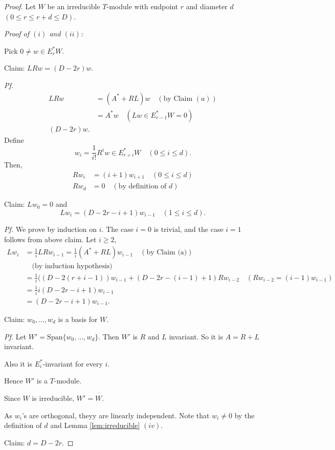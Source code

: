 \documentclass[
]{book}
\theoremstyle{definition}
\theoremstyle{definition}
\theoremstyle{definition}
\theoremstyle{definition}
\theoremstyle{remark}
\begin{document}
\begin{proof}
Let \(W\) be an irreducible \(T\)-module with endpoint \(r\) and diameter \(d\) \((0\leq r \leq r+d \leq D)\).

\emph{Proof of \((i)\) and \((ii)\):}

Pick \(0\neq w \in E^*_rW\).

Claim: \(LRw = (D-2r)w\).

\emph{Pf.}
\begin{align} 
LRw & = (A^*+RL)w \quad (\text{by Claim }(a))\\
& = A^*w \quad (Lw \in E^*_{r-1}W = 0)\\
(D-2r)w.
\end{align}
Define
\[w_i = \frac{1}{i!}R^iw \in E^*_{r+i}W \quad (0\leq i \leq d).\]
Then,
\begin{align}
Rw_i & = (i+1)w_{i+1}\quad (0\leq i \leq d)\\
Rw_d & = 0 \quad (\text{by definition of }d)
\end{align}

Claim: \(Lw_0 = 0\) and
\[Lw_i = (D-2r-i+1)w_{i-1} \quad (1\leq i\leq d).\]

\emph{Pf.} We prove by induction on \(i\).
The case \(i=0\) is trivial, and the case \(i=1\) follows from above claim.
Let \(i\geq 2\),
\begin{align}
Lw_i & = \frac{1}{i}LRw_{i-1} = \frac{1}{i}(A^*+RL)w_{i-1} \quad (\text{by Claim (a)})\\
& \quad \text{(by induction hypothesis)}\\
& = \frac{1}{i}((D-2(r+i-1))w_{i-1} + (D-2r-(i-1)+1)Rw_{i-2} \quad (Rw_{i-2} = (i-1)w_{i-1})\\
& = \frac{1}{i}i(D-2r-i+1)w_{i-1}\\
& = (D-2r-i+1)w_{i-1}.
\end{align}

Claim: \(w_0, \ldots, w_d\) is a basis for \(W\).

\emph{Pf.}
Let \(W' = \mathrm{Span}\{w_0, \ldots, w_d\}\). Then \(W'\) is \(R\) and \(L\) invariant. So it is \(A = R+L\) invariant.

Also it is \(E^*_i\)-invariant for every \(i\).

Hence \(W'\) is a \(T\)-module.

Since \(W\) is irreducible, \(W' = W\).

As \(w_i\)'s are orthogonal, theyy are linearly independent. Note that \(w_i\neq 0\) by the definition of \(d\) and Lemma \ref{lem:irreducible} \((iv)\).

Claim: \(d = D-2r\).


\end{proof}
\end{document}
